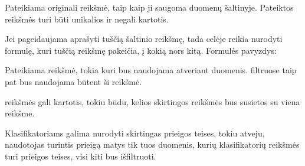 \documentclass[letterpaper,10pt,lithuanian]{sphinxmanual}
\begin{document}
\begin{fulllineitems}
\label{\detokenize{dimensijos:enum.source}}
\pysigstartsignatures
{}
\pysigstopsignatures
\sphinxAtStartPar
Pateikiama originali reikšmė, taip kaip ji saugoma duomenų šaltinyje.
Pateiktos reikšmės turi būti unikalios ir negali kartotis.

\sphinxAtStartPar
Jei pageidaujama aprašyti tuščią šaltinio reikšmę, tada
{\hyperref[\detokenize{dimensijos:property.prepare}]{}} celėje reikia nurodyti formulę, kuri tuščią
reikšmę pakeičia, į kokią nors kitą. Formulės pavyzdys:

\begin{sphinxVerbatim}[commandchars=\\\{\}]
 
\end{sphinxVerbatim}

\end{fulllineitems}


\begin{fulllineitems}
\label{\detokenize{dimensijos:enum.prepare}}
\pysigstartsignatures
{}
\pysigstopsignatures
\sphinxAtStartPar
Pateikiama reikšmė, tokia kuri bus naudojama atveriant duomenis.
{\hyperref[\detokenize{dimensijos:module-model.prepare}]{}} filtruose taip pat bus naudojama būtent ši
reikšmė.

\sphinxAtStartPar
{} reikšmės gali kartotis, tokiu būdu, kelios skirtingos
 reikšmės bus susietos su viena  reikšme.

\end{fulllineitems}


\begin{fulllineitems}
\label{\detokenize{dimensijos:enum.access}}
\pysigstartsignatures
{}
\pysigstopsignatures
\sphinxAtStartPar
Klasifikatoriams galima nurodyti skirtingas prieigos teises, tokiu
atveju, naudotojas turintis  prieigą matys tik tuos duomenis,
kurių klasifikatorių reikšmės turi  prieigos teises, visi kiti bus
išfiltruoti.

\end{fulllineitems}
\end{document}
